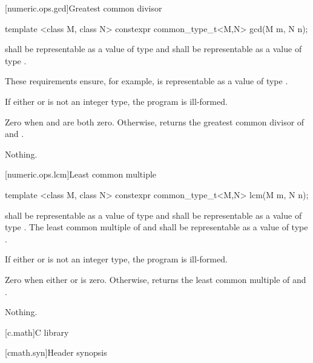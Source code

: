 [numeric.ops.gcd]{Greatest common divisor}

%
\begin{itemdecl}
template <class M, class N>
  constexpr common_type_t<M,N> gcd(M m, N n);
\end{itemdecl}

\begin{itemdescr}
\pnum
\requires
{} shall be representable as a value of type  and
 shall be representable as a value of type .
\begin{note} These requirements ensure, for example,
 is representable as a value of type . \end{note}

\pnum
\remarks
If either  or  is not an integer type, the program is ill-formed.

\pnum
\returns
Zero when  and  are both zero.
Otherwise, returns the greatest common divisor of  and .

\pnum
\throws
Nothing.
\end{itemdescr}

[numeric.ops.lcm]{Least common multiple}

%
\begin{itemdecl}
template <class M, class N>
  constexpr common_type_t<M,N> lcm(M m, N n);
\end{itemdecl}

\begin{itemdescr}
\pnum
\requires
{} shall be representable as a value of type  and
 shall be representable as a value of type .
The least common multiple of  and 
shall be representable as a value of type .

\pnum
\remarks
If either  or  is not an integer type, the program is ill-formed.

\pnum
\returns
Zero when either  or  is zero.
Otherwise, returns the least common multiple of  and .

\pnum
\throws
Nothing.
\end{itemdescr}


[c.math]{C library}

[cmath.syn]{Header  synopsis}

